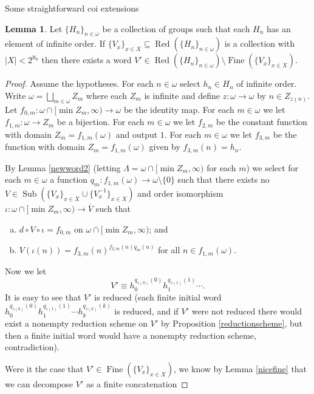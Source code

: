 \documentclass{amsart}
\theoremstyle{definition}\newtheorem{theorem}{Theorem}
\theoremstyle{definition}\newtheorem*{A}{Main Theorem}
\theoremstyle{definition}\newtheorem*{B}{Theorem \ref{elementaryequiv}}
\theoremstyle{definition}\newtheorem*{C}{Theorem \ref{continuous}}
\theoremstyle{definition}\newtheorem*{D}{Theorem \ref{bigisomorphism2}}
\theoremstyle{definition}\newtheorem{bigtheorem}{Main Theorem}
\numberwithin{theorem}{section}
\theoremstyle{definition}\newtheorem{corollary}[theorem]{Corollary}
\theoremstyle{definition}\newtheorem{proposition}[theorem]{Proposition}
\theoremstyle{definition}\newtheorem{definition}[theorem]{Definition}
\theoremstyle{definition}\newtheorem{question}[theorem]{Question}
\theoremstyle{definition}\newtheorem{example}[theorem]{Example}
\theoremstyle{definition}\newtheorem{remark}[theorem]{Remark}
\theoremstyle{definition}\newtheorem{note}[theorem]{Note}
\theoremstyle{definition}\newtheorem{lemma}[theorem]{Lemma}
\theoremstyle{definition}\newtheorem{fact}[theorem]{Fact}
\theoremstyle{definition}\newtheorem{define}[theorem]{Definition}
\theoremstyle{definition}\newtheorem{claim}[theorem]{Claim}
\theoremstyle{definition}\newtheorem{obs}[theorem]{Observation}
\theoremstyle{definition}\newtheorem{definitions}[theorem]{Definitions}
\newcommand{\Red}{\operatorname{Red}}
\newcommand{\Sub}{\operatorname{Sub}}
\newcommand{\Fine}{\operatorname{Fine}}
\begin{document}
\begin{section}{Some straightforward coi extensions}
\begin{lemma}\label{notdoneyet}  Let $\{H_n\}_{n \in \omega}$ be a collection of groups such that each $H_n$ has an element of infinite order.  If $\{V_x\}_{x \in X} \subseteq \Red(\{H_n\}_{n \in \omega})$ is a collection with $|X| < 2^{\aleph_0}$ then there exists a word $V' \in \Red(\{H_n\}_{n \in \omega}) \setminus \Fine(\{V_x\}_{x \in X})$.
\end{lemma}

\begin{proof}  Assume the hypotheses.  For each $n \in \omega$ select $h_n \in H_n$ of infinite order.  Write $\omega = \bigsqcup_{m \in \omega} Z_m$ where each $Z_m$ is infinite and define $z: \omega \rightarrow \omega$ by $n \in Z_{z(n)}$.  Let $f_{0, m}: \omega \cap [\min Z_m, \infty) \rightarrow \omega$ be the identity map.  For each $m \in \omega$ we let $f_{1, m}: \omega \rightarrow Z_m$ be a bijection.  For each $m \in \omega$ we let $f_{2, m}$ be the constant function with domain $Z_m = f_{1, m}(\omega)$ and output $1$.  For each $m \in \omega$ we let $f_{3, m}$ be the function with domain $Z_m = f_{1, m}(\omega)$ given by $f_{3, m}(n) = h_n$.

By Lemma \ref{newword2} (letting $\Lambda = \omega \cap  [\min Z_m, \infty)$ for each $m$) we select for each $m \in \omega$ a function $q_m: f_{1, m}(\omega) \rightarrow \omega \setminus \{0\}$ such that there exists no $V \in \Sub(\{V_x\}_{x \in X} \cup \{V_x^{-1}\}_{x\in X})$ and order isomorphism $\iota: \omega \cap [\min Z_m, \infty) \rightarrow \overline{V}$ such that

\begin{enumerate}[(a)]

\item $d \circ V \circ \iota = f_{0, m}$ on $\omega \cap [\min Z_m, \infty)$; and

\item $V(\iota(n)) = f_{3, m}(n)^{f_{2, m}(n)q_m(n)}$ for all $n \in f_{1, m}(\omega)$.
\end{enumerate}

\noindent Now we let $$V' \equiv h_0^{q_{z(0)}(0)}h_1^{q_{z(1)}(1)} \cdots .$$  It is easy to see that $V'$ is reduced (each finite initial word $h_0^{q_{z(0)}(0)}h_1^{q_{z(1)}(1)} \cdots h_k^{q_{z(k)}(k)}$ is reduced, and if $V'$ were not reduced there would exist a nonempty reduction scheme on $V'$ by Proposition \ref{reductionscheme}, but then a finite initial word would have a nonempty reduction scheme, contradiction).

Were it the case that $V' \in \Fine(\{V_x\}_{x \in X})$, we know by Lemma \ref{nicefine} that we can decompose $V'$ as a finite concatenation


\end{proof}
\end{section}
\end{document}
